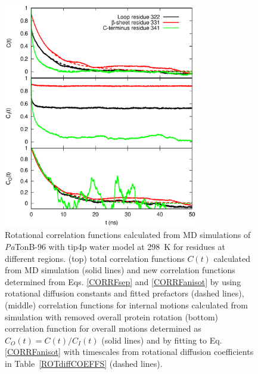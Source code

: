 \documentclass[journal=jpcbfk,manuscript=article]{achemso}
\begin{document}
\begin{figure}[!h]
  \includegraphics[width=8.5cm]{../Figs/exampleCORRF2.eps}%
  \caption{Rotational correlation functions calculated from MD simulations of {\it Pa}TonB-96 with tip4p water
    model at 298~K for residues at different regions.
    (top) total correlation functions $C(t)$ calculated from MD simulation (solid lines) and
    new correlation functions determined from Eqs. \ref{CORRFsep} and \ref{CORRFanisot} by
    using rotational diffusion constants and fitted prefactors (dashed lines),
    (middle) correlation functions for internal motions calculated from simulation with removed overall protein rotation
    (bottom) correlation function for overall motions determined as $C_O(t)=C(t)/C_I(t)$ (solid lines) and by fitting
    to Eq. \ref{CORRFanisot} with timescales from rotational diffusion coefficients in Table~\ref{ROTdiffCOEFFS} (dashed lines).
    }\label{exampleCORRF}
\end{figure}
\end{document}
